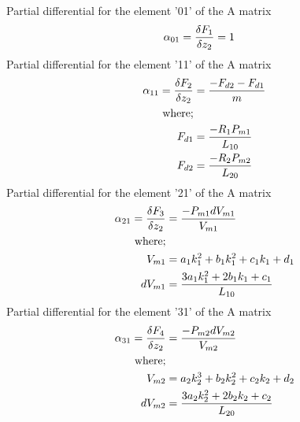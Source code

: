 \documentclass[11pt,a4paper]{article}
\begin{document}
\begin{appendices}
Partial differential for the element '01' of the A matrix\newline
\begin{align}
    \alpha_{01} = \fdv{F_1}{z_2} &= 1
\end{align}
Partial differential for the element '11' of the A matrix\newline
\begin{align}
    \alpha_{11} = \fdv{F_2}{z_2} &= \frac{-F_{d2} - F_{d1}}{m}
    \label{math:alpha_11_matrix}\\
    \text{where;}\nonumber\\
    F_{d1} &= \frac{-R_1 P_{m1}}{L_{10}}\nonumber\\
    F_{d2} &= \frac{-R_2 P_{m2}}{L_{20}}\nonumber
\end{align}
Partial differential for the element '21' of the A matrix\newline
\begin{align}
    \alpha_{21} = \fdv{F_3}{z_2} &= \frac{-P_{m1} dV_{m1}}{V_{m1}}
    \label{math:alpha_21_matrix}\\
    \text{where;}\nonumber\\
    V_{m1}     &= a_1 k_{1}^2 + b_1 k_{1}^2 + c_1 k_{1} + d_1\nonumber\\
    dV_{m1} &= \frac{3 a_1 k_{1}^2 + 2 b_1 k_{1} + c_1}{L_{10}}\nonumber
\end{align}
Partial differential for the element '31' of the A matrix\newline
\begin{align}
    \alpha_{31} = \fdv{F_4}{z_2} &= \frac{-P_{m2} dV_{m2}}{V_{m2}}
    \label{math:alpha_31_matrix}\\
    \text{where;}\nonumber\\
    V_{m2}     &= a_2 k_{2}^3 + b_2 k_{2}^2 + c_2 k_{2} + d_2\nonumber\\
    dV_{m2} &= \frac{3 a_2 k_{2}^2 + 2 b_2 k_{2} + c_2}{L_{20}}\nonumber
\end{align}


\end{appendices}
\end{document}
